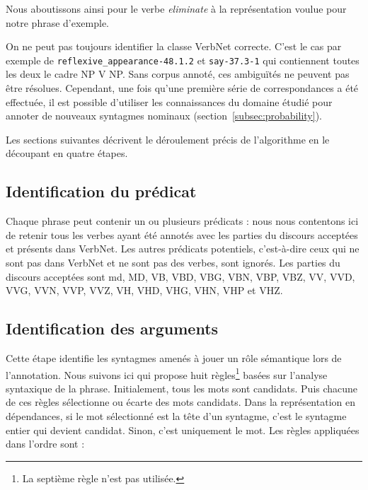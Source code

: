 Nous aboutissons ainsi pour le verbe \emph{eliminate} à la représentation
voulue pour notre phrase d'exemple.

On ne peut pas toujours identifier la classe VerbNet correcte. C'est le cas par
exemple de \texttt{reflexive\_appearance-48.1.2} et \texttt{say-37.3-1} qui
contiennent toutes les deux le cadre NP V NP. Sans corpus annoté, ces
ambiguïtés ne peuvent pas être résolues.  Cependant, une fois qu'une première
série de correspondances a été effectuée, il est possible d'utiliser les
connaissances du domaine étudié pour annoter de nouveaux syntagmes nominaux
(section~\ref{subsec:probability}).

Les sections suivantes décrivent le déroulement précis de l'algorithme en le
découpant en quatre étapes.

\subsection{Identification du prédicat}

Chaque phrase peut contenir un ou plusieurs prédicats : nous nous contentons
ici de retenir tous les verbes ayant été annotés avec les parties du discours
acceptées et présents dans VerbNet. Les autres prédicats potentiels,
c'est-à-dire ceux qui ne sont pas dans VerbNet et ne sont pas des verbes, sont
ignorés. Les parties du discours acceptées sont md, MD, VB, VBD, VBG, VBN, VBP,
VBZ, VV, VVD, VVG, VVN, VVP, VVZ, VH, VHD, VHG, VHN, VHP et VHZ.

\subsection{Identification des arguments}

Cette étape identifie les syntagmes amenés à jouer un rôle sémantique lors de
l'annotation. Nous suivons ici \cite{lang2011unsupervised} qui propose huit
règles\footnote{La septième règle n'est pas utilisée.} basées sur l'analyse
syntaxique de la phrase. Initialement, tous les mots sont candidats. Puis
chacune de ces règles sélectionne ou écarte des mots candidats. Dans la
représentation en dépendances, si le mot sélectionné est la tête d'un syntagme,
c'est le syntagme entier qui devient candidat. Sinon, c'est uniquement le mot.
Les règles appliquées dans l'ordre sont :

